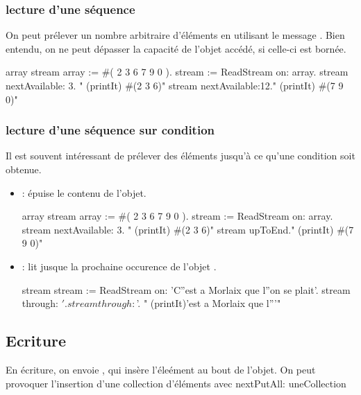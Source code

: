 \subsubsection{lecture d'une s\'equence}
On peut pr\'elever un nombre arbitraire d'\'el\'ements en utilisant le message . Bien entendu, on ne peut d\'epasser la capacit\'e de l'objet acc\'ed\'e, si celle-ci est born\'ee. 

\begin{scode}
\stBar array stream \stBar
array := #( 2  3 6 7 9 0 ).
stream := ReadStream on: array.
stream nextAvailable: 3. " (printIt) #(2 3 6)"
stream nextAvailable:12." (printIt) #(7 9 0)"
\end{scode}

\subsubsection{lecture d'une s\'equence sur condition}
Il est souvent int\'eressant de pr\'elever des \'el\'ements jusqu'\`a ce qu'une
condition soit obtenue.

\begin{itemize}
\item {}: \'epuise le contenu de l'objet.\\
\begin{scode}
\stBar array stream \stBar
array := #( 2  3 6 7 9 0 ).
stream := ReadStream on: array.
stream nextAvailable: 3. " (printIt) #(2 3 6)"
stream upToEnd." (printIt) #(7 9 0)" 
\end{scode}

\item {}: lit jusque la prochaine occurence de l'objet .\\
\begin{scode}
\stBar stream \stBar
stream := ReadStream on: 'C''est a Morlaix que l''on se plait'.
stream through:  $'.  
stream through:  $'. " (printIt)'est a Morlaix que l'''" 
\end{scode}
\end{itemize}

\subsection{Ecriture}

En \'ecriture, on envoie , qui ins\`ere 
l'\'ele\'ement au bout de l'objet. On  peut provoquer l'insertion
d'une collection d'\'el\'ements avec {nextPutAll: uneCollection}


